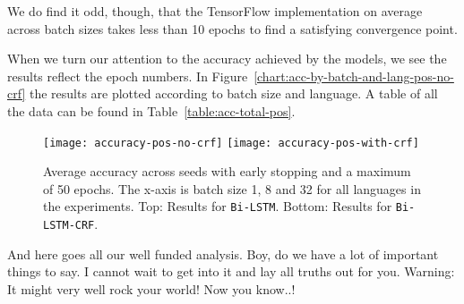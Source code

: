 We do find it odd, though, that the TensorFlow implementation on average across
batch sizes takes less than 10 epochs to find a satisfying convergence point.

When we turn our attention to the accuracy achieved by the models, we see the
results reflect the epoch numbers. In
Figure~\ref{chart:acc-by-batch-and-lang-pos-no-crf} the results are plotted
according to batch size and language. A table of all the data can be found in
Table~\ref{table:acc-total-pos}.

\begin{figure}[h!]
    \texttt{[image: accuracy-pos-no-crf]}
    \texttt{[image: accuracy-pos-with-crf]}
    \caption{Average accuracy across seeds with early stopping and a maximum of
        50 epochs. The x-axis is batch size 1, 8 and 32 for all languages in the
        experiments. Top: Results for \texttt{Bi-LSTM}. Bottom: Results for
        \texttt{Bi-LSTM-CRF}.
    }\label{chart:acc-by-batch-and-lang-pos}
\end{figure}

And here goes all our well funded analysis. Boy, do we have a lot of important
things to say. I cannot wait to get into it and lay all truths out for you.
Warning: It might very well rock your world! Now you know..!

